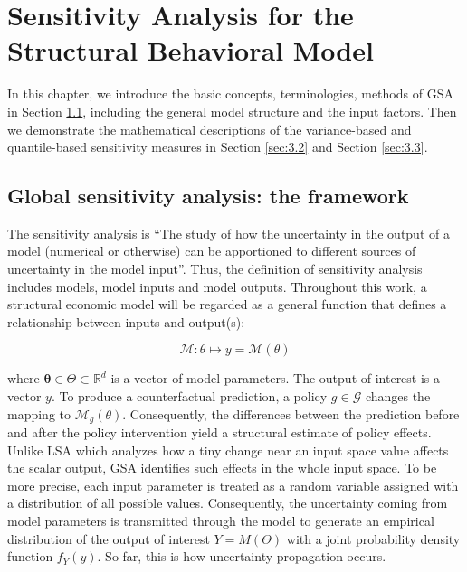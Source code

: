 \section{Sensitivity Analysis for the Structural Behavioral Model} \label{sec:3}
\thispagestyle{plain} %


In this chapter, we introduce the basic concepts, terminologies, methods of GSA in Section \ref{sec:3.1}, including the general model structure and the input factors. Then we demonstrate the mathematical descriptions of the variance-based and quantile-based sensitivity measures in Section \ref{sec:3.2} and Section \ref{sec:3.3}.

\subsection{Global sensitivity analysis: the framework} \label{sec:3.1}

The sensitivity analysis is “The study of how the uncertainty in the output of a model (numerical or otherwise) can be apportioned to different sources of uncertainty in the model input”\citep{saltelli2004SensitivityAnalysisPractice}. Thus, the definition of sensitivity analysis includes models, model inputs and model outputs. Throughout this work, a structural economic model will be regarded as a general function that defines a relationship between inputs and output(s):

\begin{equation} \label{eq:6}
\mathcal{M}: \theta \mapsto y=\mathcal{M}(\theta)
\end{equation}


\noindent
where $\boldsymbol{\theta} \in \Theta \subset \mathbb{R}^{d}$ is a vector of model parameters. The output of interest is a vector $y$. To produce a counterfactual prediction, a policy $g \in \mathcal{G}$ changes the mapping to $\mathcal{M}_g(\theta)$\citep{eisenhauer2021StructuralModelsPolicymaking}. Consequently, the differences between the prediction before and after the policy intervention yield a structural estimate of policy effects. \\

\noindent
Unlike LSA which analyzes how a tiny change near an input space value affects the scalar output, GSA identifies such effects in the whole input space. To be more precise, each input parameter is treated as a random variable assigned with a distribution of all possible values. Consequently, the uncertainty coming from model parameters is transmitted through the model to generate an empirical distribution of the output of interest $Y = M(\Theta)$ with a joint probability density function $f_Y(y)$. So far, this is how uncertainty propagation occurs. \\

